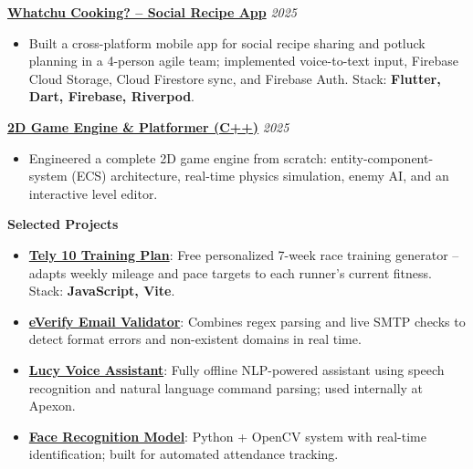 \documentclass[a4paper,10pt]{article}
\begin{document}
\vspace{1pt}
\noindent\href{https://youtu.be/VXxmrGYtY_g}{\textbf{Whatchu Cooking? -- Social Recipe App}} \hfill \textit{\small 2025}
\begin{itemize}
  \item Built a cross-platform mobile app for social recipe sharing and potluck planning in a 4-person agile team; implemented voice-to-text input, Firebase Cloud Storage, Cloud Firestore sync, and Firebase Auth. Stack: \textbf{Flutter, Dart, Firebase, Riverpod}.
\end{itemize}

\vspace{1pt}
\noindent\href{https://youtu.be/HgRQLTaYomY}{\textbf{2D Game Engine \& Platformer (C++)}} \hfill \textit{\small 2025}
\begin{itemize}
  \item Engineered a complete 2D game engine from scratch: entity-component-system (ECS) architecture, real-time physics simulation, enemy AI, and an interactive level editor.
\end{itemize}

\vspace{1pt}
\noindent\textbf{Selected Projects}
\begin{itemize}
  \item \href{https://tely10-training-plan.vercel.app/}{\textbf{Tely 10 Training Plan}}: Free personalized 7-week race training generator -- adapts weekly mileage and pace targets to each runner's current fitness. Stack: \textbf{JavaScript, Vite}.
  \item \href{https://vm1610.github.io/everify/}{\textbf{eVerify Email Validator}}: Combines regex parsing and live SMTP checks to detect format errors and non-existent domains in real time.
  \item \href{https://github.com/vm1610/lucy-voice-assistant}{\textbf{Lucy Voice Assistant}}: Fully offline NLP-powered assistant using speech recognition and natural language command parsing; used internally at Apexon.
  \item \href{https://github.com/vm1610/face-recognition}{\textbf{Face Recognition Model}}: Python + OpenCV system with real-time identification; built for automated attendance tracking.
\end{itemize}

\end{document}
